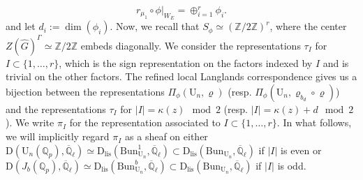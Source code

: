 \documentclass[reqno,11pt]{amsart}
\theoremstyle{remark}
\newcommand{\U}{\mathrm{U}}
\newcommand{\Bun}{\mathrm{Bun}}
\newcommand{\Dc}{\mathrm{D}}
\newcommand{\Dlis}{\mathrm{D}_{\mathrm{lis}}}
\def\ol{\overline}
\begin{document}
\[ r_{\mu_{1}} \circ \phi|_{W_{E}} = \oplus_{i = 1}^{r} \phi_{i}. \]
and let $d_{i} := \dim(\phi_{i})$. Now, we recall that $S_{\phi} \simeq (\mathbb{Z}/2\mathbb{Z})^{r}$, where the center $Z(\hat{G})^{\Gamma} \simeq \mathbb{Z}/2\mathbb{Z}$ embeds diagonally. We consider the representations $\tau_{I}$ for $I \subset \{1,\ldots,r\}$, which is the sign representation on the factors indexed by $I$ and is trivial on the other factors. The refined local Langlands correspondence gives us a bijection between the representations $\Pi_{\phi}(\U_n, \varrho)$ (resp. $\Pi_{\phi}(\U_{n}, \varrho_{b_d} \circ \varrho)$) and the representations $\tau_{I}$ for $|I|  = \kappa(z) \mod 2$ (resp. $|I| = \kappa(z) + d \mod 2$). We write $\pi_{I}$ for the representation associated to $I \subset \{1,\ldots,r\}$. In what follows, we will implicitly regard $\pi_{I}$ as a sheaf on either $\Dc(\U_n(\mathbb{Q}_{p}),\ol{\mathbb{Q}}_{\ell}) \simeq \Dlis(\Bun_{\U_n}^{1},\ol{\mathbb{Q}}_{\ell}) \subset \Dlis(\Bun_{\U_n},\ol{\mathbb{Q}}_{\ell})$ if $|I|$ is even or $\Dc(J_{b}(\mathbb{Q}_{p}),\ol{\mathbb{Q}}_{\ell}) \simeq \Dlis(\Bun_{\U_n}^{b},\ol{\mathbb{Q}}_{\ell}) \subset \Dlis(\Bun_{\U_n},\ol{\mathbb{Q}}_{\ell})$ if $|I|$ is odd.
\end{document}
